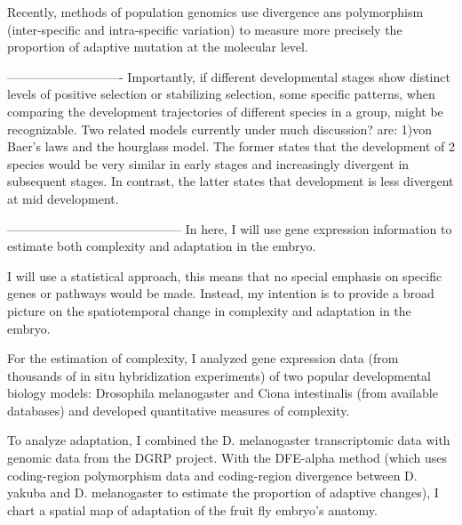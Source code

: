 Recently, methods of population genomics use divergence ans polymorphism (inter-specific and intra-specific variation) to measure more precisely the proportion of adaptive mutation at the molecular level.

----------------------------
Importantly, if different developmental stages show distinct levels of positive selection or stabilizing selection,
some specific patterns, when comparing the development trajectories of different species in a group, might be recognizable.
Two related models currently under much discussion? are:
1)von Baer's laws and the hourglass model.
The former states that the development of 2 species would be very similar in early stages and increasingly divergent in subsequent stages. In contrast, the latter states that development is less divergent at mid development.

------------------------------------------
In here, I will use gene expression information to estimate 
both complexity and adaptation in the embryo.

I will use a statistical approach, this means that no special emphasis on specific genes or pathways would be made. 
Instead, my intention is to provide a broad picture on the spatiotemporal change in complexity and adaptation in the embryo.

For the estimation of complexity, I analyzed gene expression data (from thousands of in situ hybridization experiments) of two popular developmental biology models: Drosophila melanogaster and Ciona intestinalis (from available databases) and developed quantitative measures of complexity.

To analyze adaptation, I combined the D. melanogaster transcriptomic data with genomic data from the DGRP project. With the DFE-alpha method (which uses coding-region polymorphism data and coding-region divergence between D. yakuba and D. melanogaster to estimate the proportion of adaptive changes), I chart a spatial map of adaptation of the fruit fly embryo's anatomy. 

